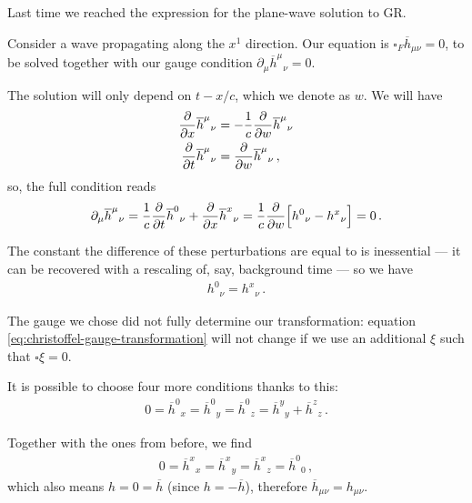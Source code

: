 \documentclass[main.tex]{subfiles}
\begin{document}

Last time we reached the expression for the plane-wave solution to GR. 

Consider a wave propagating along the \(x^{1}\) direction. 
Our equation is \(\square _F \overline{h}_{\mu \nu } = 0 \), to be solved together with our gauge condition \(\partial_{\mu } \overline{h}^{\mu }{}_\nu = 0\). 

The solution will only depend on \(t - x /c\), which we denote as \(w\). We will have 
%
\begin{align}
\pdv{}{x} \overline{h}^{\mu }{}_{\nu } &= - \frac{1}{c} \pdv{}{w } \overline{h}^{\mu }{}_\nu \\
\pdv{}{t} \overline{h}^{\mu }{}_{\nu } &=  \pdv{}{w } \overline{h}^{\mu }{}_\nu 
\,,
\end{align}
%
so, the full condition reads 
%
\begin{align}
\partial_{\mu }  \overline{h}^{\mu }{}_{\nu } = \frac{1}{c} \pdv{}{t} \overline{h}^{0}{}_\nu + \pdv{}{x} \overline{h}^{x }{}_\nu 
= \frac{1}{c} \pdv{}{w} \qty[h^{0}{}_{\nu } - h^{x}{}_{\nu }]
= 0
\,.
\end{align}

The constant the difference of these perturbations are equal to is inessential --- it can be recovered with a rescaling of, say, background time --- so we have 
%
\begin{align}
h^{0}{}_{\nu } = h^{x}{}_{\nu }
\,.
\end{align}

The gauge we chose did not fully determine our transformation: equation \eqref{eq:christoffel-gauge-transformation} will not change if we use an additional \(\xi \) such that \(\square \xi  =0 \). 

It is possible to choose four more conditions thanks to this: 
%
\begin{align}
0 
= \overline{h}^{0}{}_{x}
= \overline{h}^{0}{}_{y}
= \overline{h}^{0}{}_{z}
= \overline{h}^{y}{}_{y} + \overline{h}^{z}{}_{z}
\,.
\end{align}

Together with the ones from before, we find 
%
\begin{align}
0 
= \overline{h}^{x}{}_{x}
= \overline{h}^{x}{}_{y}
= \overline{h}^{x}{}_{z}
= \overline{h}^{0}{}_{0}
\,,
\end{align}
%
which also means \(h = 0 = \overline{h}\) (since \(h = - \overline{h}\)), therefore \(\overline{h}_{\mu \nu } = h_{\mu \nu } \). 
\end{document}
